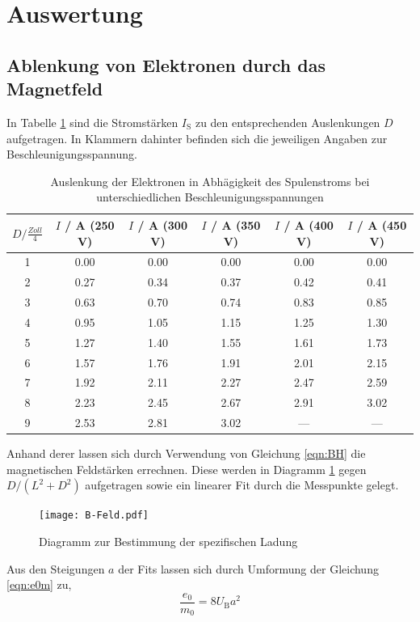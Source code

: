 \section{Auswertung}
\label{sec:Auswertung}
\subsection{Ablenkung von Elektronen durch das Magnetfeld}
In Tabelle \ref{tab:DIS} sind die Stromstärken $I_\text{S}$ zu den entsprechenden Auslenkungen $D$ aufgetragen. In Klammern dahinter befinden sich die jeweiligen Angaben zur Beschleunigungsspannung.
\begin{table}
  \centering
  \begin{tabular}{c| c c c c c }
    \toprule
    $D / \frac{Zoll}{4}$ & $I$ / A (250 V) & $I$ / A (300 V) & $I$ / A (350 V) & $I$ / A (400 V) & $I$ / A (450 V) \\
    \midrule
    1 &	0.00	&0.00	&0.00	&0.00	&0.00	\\
    2 &	0.27	&0.34	&0.37	&0.42	&0.41	\\
    3 &	0.63	&0.70	&0.74	&0.83	&0.85	\\
    4 &	0.95	&1.05	&1.15	&1.25	&1.30	\\
    5 &	1.27	&1.40	&1.55	&1.61	&1.73	\\
    6 &	1.57	&1.76	&1.91	&2.01	&2.15	\\
    7 &	1.92	&2.11 	&2.27	&2.47	&2.59	\\
    8 &	2.23	&2.45	&2.67	&2.91	&3.02	\\
    9 &	2.53	&2.81	&3.02	&---	&---	\\
    \bottomrule
  \end{tabular}
  \caption{Auslenkung der Elektronen in Abhägigkeit des Spulenstroms bei unterschiedlichen Beschleunigungsspannungen}
  \label{tab:DIS}
\end{table}
Anhand derer lassen sich durch Verwendung von Gleichung \eqref{eqn:BH} die magnetischen Feldstärken errechnen. Diese werden in Diagramm \ref{fig:bfeld} gegen $D/(L^2+D^2)$ aufgetragen sowie ein linearer Fit durch die Messpunkte gelegt.
\begin{figure}
  \centering
  \texttt{[image: B-Feld.pdf]}
  \caption{Diagramm zur Bestimmung der spezifischen Ladung}
  \label{fig:bfeld}
\end{figure}
Aus den Steigungen $a$ der Fits lassen sich durch Umformung der Gleichung \eqref{eqn:e0m} zu,
\begin{equation}
  \frac{e_0}{m_0} = 8 U_\text{B} a^2 
  \label{eqn:e0m0}
\end{equation}

